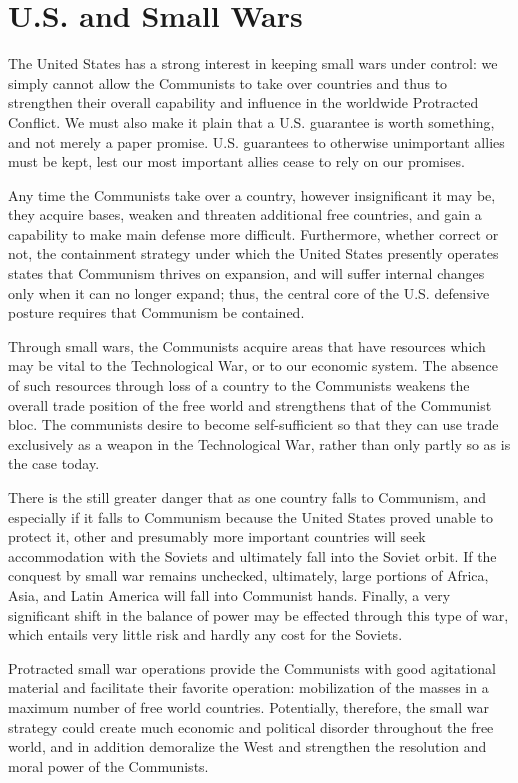 \section{U.S. and Small Wars}
The United States has a strong interest in keeping small wars under control: we simply cannot allow the Communists to take over countries and thus to strengthen their overall capability and influence in the worldwide Protracted Conflict. We must also make it plain that a U.S. guarantee is worth something, and not merely a paper promise. U.S. guarantees to otherwise unimportant allies must be kept, lest our most important allies cease to rely on our promises.

Any time the Communists take over a country, however insignificant it may be, they acquire bases, weaken and threaten additional free countries, and gain a capability to make main defense more difficult. Furthermore, whether correct or not, the containment strategy under which the United States presently operates states that Communism thrives on expansion, and will suffer internal changes only when it can no longer expand; thus, the central core of the U.S. defensive posture requires that Communism be contained.

Through small wars, the Communists acquire areas that have resources which may be vital to the Technological War, or to our economic system. The absence of such resources through loss of a country to the Communists weakens the overall trade position of the free world and strengthens that of the Communist bloc. The communists desire to become self-sufficient so that they can use trade exclusively as a weapon in the Technological War, rather than only partly so as is the case today.

There is the still greater danger that as one country falls to Communism, and especially if it falls to Communism because the United States proved unable to protect it, other and presumably more important countries will seek accommodation with the Soviets and ultimately fall into the Soviet orbit. If the conquest by small war remains unchecked, ultimately, large portions of Africa, Asia, and Latin America will fall into Communist hands. Finally, a very significant shift in the balance of power may be effected through this type of war, which entails very little risk and hardly any cost for the Soviets.

Protracted small war operations provide the Communists with good agitational material and facilitate their favorite operation: mobilization of the masses in a maximum number of free world countries. Potentially, therefore, the small war strategy could create much economic and political disorder throughout the free world, and in addition demoralize the West and strengthen the resolution and moral power of the Communists.

